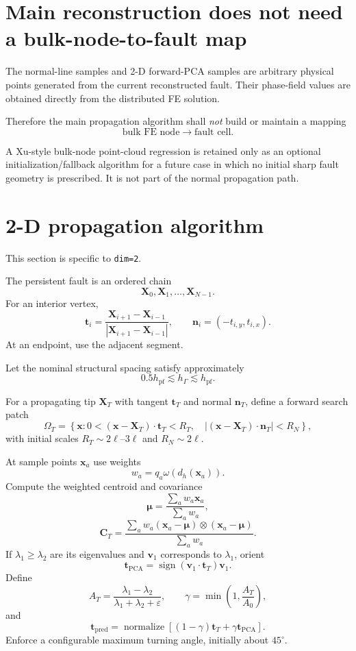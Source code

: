 \documentclass[11pt]{article}
\newcommand{\wh}{\omega}
\begin{document}
\section{Main reconstruction does not need a bulk-node-to-fault map}

The normal-line samples and 2-D forward-PCA samples are arbitrary physical points generated from the current reconstructed fault.  Their phase-field values are obtained directly from the distributed FE solution.

Therefore the main propagation algorithm shall \emph{not} build or maintain a mapping
\[
\text{bulk FE node}\longrightarrow\text{fault cell}.
\]

A Xu-style bulk-node point-cloud regression is retained only as an optional initialization/fallback algorithm for a future case in which no initial sharp fault geometry is prescribed.  It is not part of the normal propagation path.

\section{2-D propagation algorithm}

This section is specific to \texttt{dim=2}.

The persistent fault is an ordered chain
\[
\mathbf{X}_0,\mathbf{X}_1,\ldots,\mathbf{X}_{N-1}.
\]
For an interior vertex,
\[
\mathbf{t}_i
=
\frac{\mathbf{X}_{i+1}-\mathbf{X}_{i-1}}
{|\mathbf{X}_{i+1}-\mathbf{X}_{i-1}|},
\qquad
\mathbf{n}_i=(-t_{i,y},t_{i,x}).
\]
At an endpoint, use the adjacent segment.

Let the nominal structural spacing satisfy approximately
\[
0.5h_{\mathrm{pf}}\lesssim h_\Gamma\lesssim h_{\mathrm{pf}}.
\]

For a propagating tip $\mathbf{X}_T$ with tangent $\mathbf{t}_T$ and normal $\mathbf{n}_T$, define a forward search patch
\[
\Omega_T
=
\left\{
\mathbf{x}:0<(\mathbf{x}-\mathbf{X}_T)\cdot\mathbf{t}_T<R_T,
\quad
|(\mathbf{x}-\mathbf{X}_T)\cdot\mathbf{n}_T|<R_N
\right\},
\]
with initial scales $R_T\sim2\ell$--$3\ell$ and $R_N\sim2\ell$.

At sample points $\mathbf{x}_a$ use weights
\[
w_a=q_a\wh(d_h(\mathbf{x}_a)).
\]
Compute the weighted centroid and covariance
\[
\boldsymbol\mu
=
\frac{\sum_a w_a\mathbf{x}_a}{\sum_a w_a},
\]
\[
\mathbf{C}_T
=
\frac{
\sum_a w_a(\mathbf{x}_a-\boldsymbol\mu)\otimes(\mathbf{x}_a-\boldsymbol\mu)
}{\sum_a w_a}.
\]
If $\lambda_1\ge\lambda_2$ are its eigenvalues and $\mathbf{v}_1$ corresponds to $\lambda_1$, orient
\[
\mathbf{t}_{\mathrm{PCA}}
=
\operatorname{sign}(\mathbf{v}_1\cdot\mathbf{t}_T)\mathbf{v}_1.
\]
Define
\[
A_T
=
\frac{\lambda_1-\lambda_2}{\lambda_1+\lambda_2+\varepsilon},
\qquad
\gamma=\min\left(1,\frac{A_T}{A_0}\right),
\]
and
\[
\mathbf{t}_{\mathrm{pred}}
=
\operatorname{normalize}
\left[(1-\gamma)\mathbf{t}_T+\gamma\mathbf{t}_{\mathrm{PCA}}\right].
\]
Enforce a configurable maximum turning angle, initially about $45^\circ$.
\end{document}
